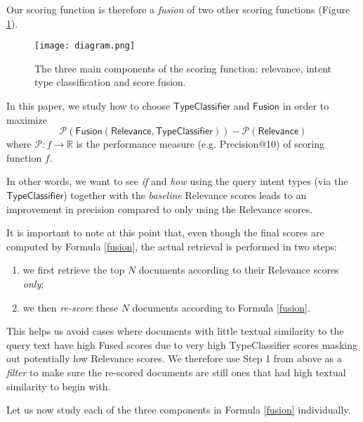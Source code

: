 Our scoring function is therefore a \emph{fusion} of two other scoring functions (Figure \ref{diagram}).

\begin{figure}[h!]
\centerline{
  \texttt{[image: diagram.png]}
  }
  \caption{The three main components of the scoring function:
  relevance, intent type classification and score fusion.}
  \label{diagram}
\end{figure}

In this paper, we study how to choose $\textsf{TypeClassifier}$ and $\textsf{Fusion}$ in order to maximize
\[
 \mathcal{P}(\textsf{Fusion}(\textsf{Relevance}, \textsf{TypeClassifier})) - \mathcal{P}(\textsf{Relevance})
\]
where $\mathcal{P}: f \rightarrow \mathbb{R}$ is the performance measure (e.g. Precision@10) of scoring function $f$.

In other words, we want to see \emph{if} and \emph{how} using the query intent types (via the
$\textsf{TypeClassifier}$) together with the \emph{baseline} \textsf{Relevance} scores
leads to an improvement in precision compared to only using the \textsf{Relevance} scores.

It is important to note at this point that, even though the final scores are computed by Formula \ref{fusion},
the actual retrieval is performed in two steps:
\begin{enumerate}
 \item we first retrieve the top $N$ documents according to their \textsf{Relevance} scores \emph{only};
 \vspace{-0.2cm}
 \item we then \emph{re-score} these $N$ documents according to Formula \ref{fusion}.
\end{enumerate}
This helps us avoid cases where documents with little textual similarity to the query text
have high \textsf{Fused} scores due to very high \textsf{TypeClassifier} scores masking out potentially low \textsf{Relevance} scores.
We therefore use Step 1 from above as a \emph{filter} to make sure the re-scored documents are still ones that had high textual
similarity to begin with.

Let us now study each of the three components in Formula \ref{fusion} individually.

